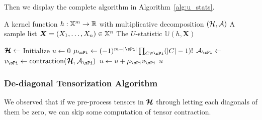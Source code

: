 \documentclass[letterpaper,11pt]{article}
\newcommand{\ustat}{\mathbb{U}}
\newcommand{\samplespace}{\bbX}
\newcommand{\partition}{\mathrm{Partition}}
\newcommand{\partitionp}[1]{\partition(#1)}
\newcommand{\tensorcontraction}{\mathrm{contraction}}
\begin{document}
Then we display the complete algorithm in Algorithm~\ref{alg:u_stats}. 

\begin{algorithm}
    \caption{Computation of $U$-statistics via Tensorization}
    \label{alg:u_stats}
    \begin{algorithmic}[1]
        \Require 
            \Statex A kernel function $h: \samplespace^m \to \reals$ with multiplicative decomposition $({\mathcal{H}}, {\mathcal{A}})$
            \Statex A sample list $\bm{X} = (X_1, \dots, X_n) \in \samplespace^n$
        \Ensure The $U$-statistic $\ustat(h, \bm{X})$ 

            \State $\bm{{\mathcal{H}}} \gets$   
            \State Initialize $u \gets 0$
            \For{$\sPi \in \partitionp{m}$}  
                \State $\mu_\sPi \gets (-1)^{m-|\sPi|} \prod_{C \in \sPi} (|C|-1)!$  
                \State $\calA_\sPi \gets$   
                \State $v_{\sPi} \gets \tensorcontraction(\bm{\calH}, \calA_\sPi)$  
                \State $u \gets u + \mu_\sPi v_{\sPi}$  
            \EndFor
            \State \Return $u$  
        \EndFunction
    \end{algorithmic}
\end{algorithm}

\subsubsection{De-diagonal Tensorization Algorithm}

We observed that if we pre-process tensors in $\bm{{\mathcal{H}}}$ through letting each diagonals of them be zero, we can skip some computation of tensor contraction. 
\end{document}
